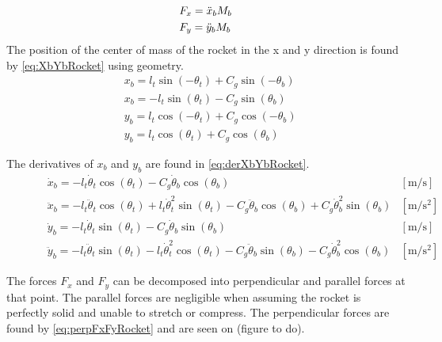 		\begin{subequations}  \label{eq:FxFyRocket}
			\begin{flalign}
				& F_x=\ddot{x}_bM_b  \addunit{\newton}\\
				& F_y=\ddot{y}_bM_b  \addunit{\newton}\\
			\end{flalign}
		\end{subequations}
		\startexplain
		\stopexplain
		The position of the center of mass of the rocket in the x and y direction is found by \vref{eq:XbYbRocket} using geometry.
		\begin{subequations}\label{eq:XbYbRocket} 
			\begin{flalign}
				& x_b=l_t\sin (-\theta_t)+C_g \sin (-\theta_b) \\
				& x_b=-l_t\sin (\theta_t)-C_g \sin (\theta_b) \\
				& y_b = l_t\cos (-\theta_t)+C_g \cos(-\theta_b) \\
				& y_b = l_t\cos (\theta_t)+C_g \cos(\theta_b) 
			\end{flalign}
		\end{subequations}
		
		The derivatives of $x_b$ and $y_b$ are found in \vref{eq:derXbYbRocket}.
		\begin{subequations}\label{eq:derXbYbRocket} 
			\begin{flalign}
				\hspace{30pt} & \dot{x}_b=-l_t\dot{\theta}_t\cos(\theta_t)-C_g\dot{\theta}_b\cos(\theta_b) & [\si{\meter\per\second}] \\
				& \ddot{x}_b=-l_t\ddot{\theta}_t\cos(\theta_t)+l_t\dot{\theta}_t^2\sin(\theta_t)-C_g\ddot{\theta}_b\cos(\theta_b)+C_g\dot{\theta}_b^2\sin(\theta_b) & [\si{\meter\per\square\second}] \\
				& 
				\dot{y}_b=-l_t \dot{\theta}_t\sin(\theta_t)-C_g\dot{\theta}_b\sin(\theta_b) & [\si{\meter\per\second}] \\
				& \ddot{y}_b=-l_t\ddot{\theta}_t\sin(\theta_t)-l_t\dot{\theta}_t^2\cos(\theta_t)-C_g\ddot{\theta}_b\sin(\theta_b)-C_g\dot{\theta}_b^2\cos(\theta_b) & [\si{\meter\per\square\second}]
			\end{flalign}
		\end{subequations}
		
		The forces $F_x$ and $F_y$ can be decomposed into perpendicular and parallel forces at that point. The parallel forces are negligible when assuming the rocket is perfectly solid and unable to stretch or compress. The perpendicular forces are found by \vref{eq:perpFxFyRocket} and are seen on (figure to do).
		
